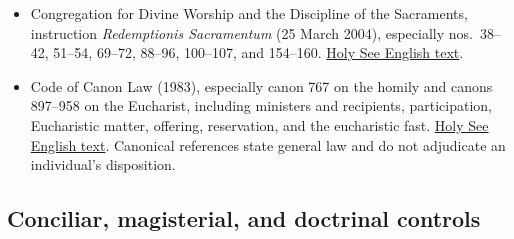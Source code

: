 \begin{itemize}
  \item Congregation for Divine Worship and the Discipline of the Sacraments, instruction \emph{Redemptionis Sacramentum} (25 March 2004), especially nos.~38--42, 51--54, 69--72, 88--96, 100--107, and 154--160. \href{https://www.vatican.va/roman_curia/congregations/ccdds/documents/rc_con_ccdds_doc_20040423_redemptionis-sacramentum_en.html}{Holy See English text}.
  \item Code of Canon Law (1983), especially canon 767 on the homily and canons 897--958 on the Eucharist, including ministers and recipients, participation, Eucharistic matter, offering, reservation, and the eucharistic fast. \href{https://www.vatican.va/archive/cod-iuris-canonici/eng/documents/cic_lib4-cann834-1253_en.html}{Holy See English text}. Canonical references state general law and do not adjudicate an individual's disposition.
\end{itemize}

\subsection{Conciliar, magisterial, and doctrinal controls}

